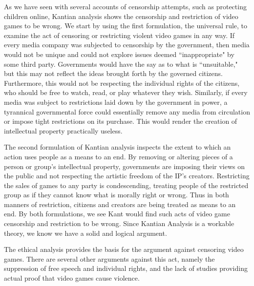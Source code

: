 
\indent \indent As we have seen with several accounts of censorship attempts, such as protecting children online, Kantian analysis shows the censorship and restriction of video games to be wrong. We start by using the first formulation, the universal rule, to examine the act of censoring or restricting violent video games in any way. If every media company was subjected to censorship by the government, then media would not be unique and could not explore issues deemed ``inappropriate" by some third party. Governments would have the say as to what is ``unsuitable," but this may not reflect the ideas brought forth by the governed citizens. Furthermore, this would not be respecting the individual rights of the citizens, who should be free to watch, read, or play whatever they wish. Similarly, if every media was subject to restrictions laid down by the government in power, a tyrannical governmental force could essentially remove any media from circulation or impose tight restrictions on its purchase. This would render the creation of intellectual property practically useless.

The second formulation of Kantian analysis inspects the extent to which an action uses people as a means to an end. By removing or altering pieces of a person or group's intellectual property, governments are imposing their views on the public and not respecting the artistic freedom of the IP's creators. Restricting the sales of games to any party is condescending, treating people of the restricted group as if they cannot know what is morally right or wrong. Thus in both manners of restriction, citizens and creators are being treated as means to an end. By both formulations, we see Kant would find such acts of video game censorship and restriction to be wrong. Since Kantian Analysis is a workable theory, we know we have a solid and logical argument. 

The ethical analysis provides the basis for the argument against censoring video games. There are several other arguments against this act, namely the suppression of free speech and individual rights, and the lack of studies providing actual proof that video games cause violence. %


